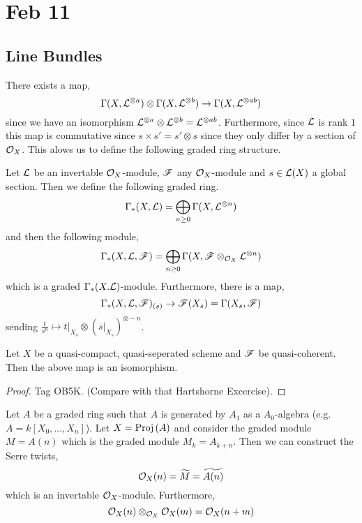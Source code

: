 \documentclass[12pt]{article}
\begin{document}
\section{Feb 11}

\subsection{Line Bundles}

There exists a map,
\[ \Gamma(X, \mathcal{L}^{\otimes a}) \otimes \Gamma(X, \mathcal{L}^{\otimes b}) \to \Gamma(X, \mathcal{L}^{\otimes ab}) \]
since we have an isomorphism $\mathcal{L}^{\otimes a} \otimes \mathcal{L}^{\otimes b} = \mathcal{L}^{\otimes ab}$. Furthermore, since $\mathcal{L}$ is rank $1$ this map is commutative since $s \times s' = s' \otimes s$ since they only differ by a section of $\mathcal{O}_{X}$. This alows us to define the following graded ring structure. 

\begin{definition}
Let $\mathcal{L}$ be an invertable $\mathcal{O}_{X}$-module, $\mathscr{F}$ any $\mathcal{O}_{X}$-module and $s \in \mathcal{L}(X)$ a global section. Then we define the following graded ring.
\[ \Gamma_*(X, \mathcal{L}) = \bigoplus_{n \ge 0} \Gamma(X, \mathcal{L}^{\otimes n}) \]
and then the following module,
\[ \Gamma_*(X, \mathcal{L}, \mathscr{F}) = \bigoplus_{n \ge 0} \Gamma(X, \mathscr{F} \otimes_{\mathcal{O}_{X}} \mathcal{L}^{\otimes n}) \]
which is a graded $\Gamma_*(X. \mathcal{L})$-module. Furthermore, there is a map,
\[ \Gamma_*(X, \mathcal{L}, \mathscr{F})_{(s)} \to \mathscr{F}(X_s) = \Gamma(X_s, \mathscr{F}) \]
sending $\frac{t}{s^n} \mapsto t|_{X_s} \otimes (s |_{X_s})^{\otimes -n}$. 
\end{definition}

\begin{proposition}
Let $X$ be a quasi-compact, quasi-seperated scheme and $\mathscr{F}$ be quasi-coherent. Then the above map is an isomorphism. 
\end{proposition}

\begin{proof}
Tag OB5K. (Compare with that Hartshorne Excercise).
\end{proof}

\begin{example}
Let $A$ be a graded ring such that $A$ is generated by $A_1$ as a $A_0$-algebra (e.g. $A = k[X_0, \dots, X_n]$). Let $X = \mathrm{Proj}\left( A \right)$ and consider the graded module $M = A(n)$ which is the graded module $M_{k} = A_{k + n}$. Then we can construct the Serre twists,
\[ \mathcal{O}_{X}(n) = \widetilde{M} = \widetilde{A(n)} \]
which is an invertable $\mathcal{O}_{X}$-module. Furthermore,
\[ \mathcal{O}_{X}(n) \otimes_{\mathcal{O}_{X}} \mathcal{O}_{X}(m) = \mathcal{O}_{X}(n + m) \]
\end{example}
\end{document}
